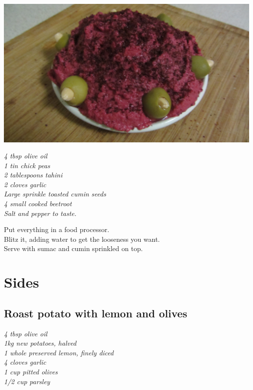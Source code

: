 \documentclass{tufte-book}
\begin{document}
\begin{marginfigure}%
  \includegraphics[width=\linewidth]{beetroothummus.png}
\end{marginfigure}

\emph{4 tbsp olive oil
\\1 tin chick peas
\\2 tablespoons tahini
\\2 cloves garlic
\\Large sprinkle toasted cumin seeds
\\4 small cooked beetroot
\\Salt and pepper to taste.
}

Put everything in a food processor.
\\Blitz it, adding water to get the looseness you want. 
\\Serve with sumac and cumin sprinkled on top.

\chapter{Sides}
\section{Roast potato with lemon and olives}

\emph{4 tbsp olive oil
\\1kg new potatoes, halved
\\1 whole preserved lemon, finely diced
\\4 cloves garlic
\\1 cup pitted olives
\\1/2 cup parsley
}
\end{document}
